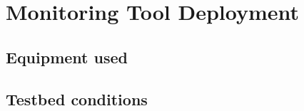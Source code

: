 
\chapter{Monitoring Tool Deployment} %

\label{Chapter5} %



\section{Equipment used}



\section{Testbed conditions}
